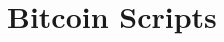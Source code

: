 \documentclass[../Bitcoin Blink.tex]{subfiles}
\begin{document}
\normalsize
\section{Bitcoin Scripts}
\end{document}
